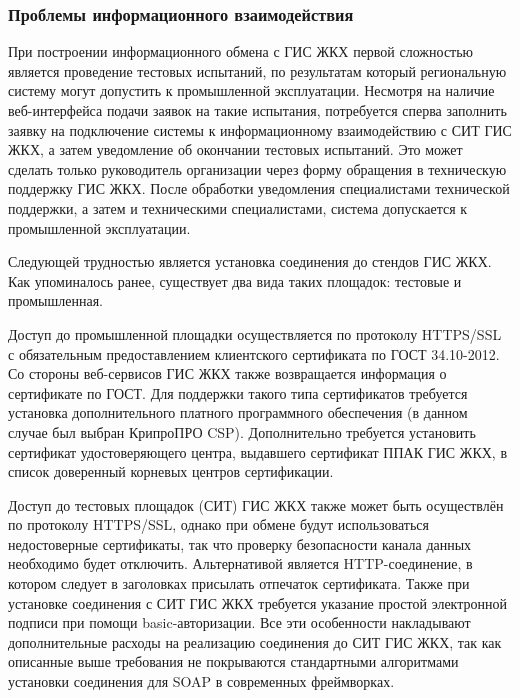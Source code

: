 
\subsubsection{Проблемы информационного взаимодействия}

При построении информационного обмена с ГИС ЖКХ первой сложностью является проведение тестовых испытаний, по результатам который региональную систему могут допустить к промышленной эксплуатации.
Несмотря на наличие веб-интерфейса подачи заявок на такие испытания, потребуется сперва заполнить заявку на подключение системы к информационному взаимодействию с СИТ ГИС ЖКХ, а затем уведомление об окончании тестовых испытаний.
Это может сделать только руководитель организации через форму обращения в техническую поддержку ГИС ЖКХ.
После обработки уведомления специалистами технической поддержки, а затем и техническими специалистами, система допускается к промышленной эксплуатации.

Следующей трудностью является установка соединения до стендов ГИС ЖКХ.
Как упоминалось ранее, существует два вида таких площадок: тестовые и промышленная.

Доступ до промышленной площадки осуществляется по протоколу HTTPS/SSL с обязательным предоставлением клиентского сертификата по ГОСТ 34.10-2012.
Со стороны веб-сервисов ГИС ЖКХ также возвращается информация о сертификате по ГОСТ.
Для поддержки такого типа сертификатов требуется установка дополнительного платного программного обеспечения (в данном случае был выбран КрипроПРО CSP).
Дополнительно требуется установить сертификат удостоверяющего центра, выдавшего сертификат ППАК ГИС ЖКХ, в список доверенный корневых центров сертификации.

Доступ до тестовых площадок (СИТ) ГИС ЖКХ также может быть осуществлён по протоколу HTTPS/SSL, однако при обмене будут использоваться недостоверные сертификаты, так что проверку безопасности канала данных необходимо будет отключить.
Альтернативой является HTTP-соединение, в котором следует в заголовках присылать отпечаток сертификата.
Также при установке соединения с СИТ ГИС ЖКХ требуется указание простой электронной подписи при помощи basic-авторизации.
Все эти особенности накладывают дополнительные расходы на реализацию соединения до СИТ ГИС ЖКХ, так как описанные выше требования не покрываются стандартными алгоритмами установки соединения для SOAP в современных фреймворках.

